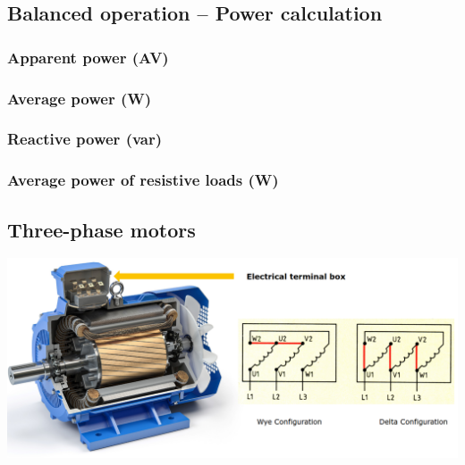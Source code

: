 \documentclass{article}
\begin{document}
\vspace*{-.5cm}

\newpage
\subsection{Balanced operation -- Power calculation}
\subsubsection{Apparent power (AV)}

\subsubsection{Average power (W)}

\subsubsection{Reactive power (var)}

\subsubsection{Average power of resistive loads (W)}


\subsection{Three-phase motors}
\begin{center}
    \includegraphics[width=\textwidth]{media/motor.png}
\end{center}
\end{document}
